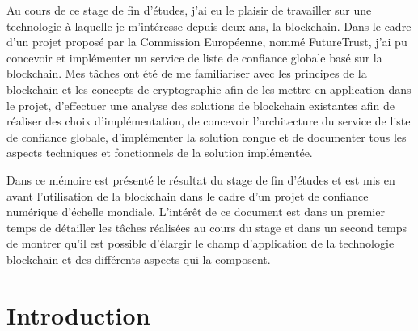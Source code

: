 \documentclass{tnreport}
\begin{document}
Au cours de ce stage de fin d'études, j'ai eu le plaisir de travailler sur une technologie à laquelle je m'intéresse depuis deux ans, la blockchain. Dans le cadre d'un projet proposé par la Commission Européenne, nommé FutureTrust, j'ai pu concevoir et implémenter un service de liste de confiance globale basé sur la blockchain. Mes tâches ont été de me familiariser avec les principes de la blockchain et les concepts de cryptographie afin de les mettre en application dans le projet, d'effectuer une analyse des solutions de blockchain existantes afin de réaliser des choix d'implémentation, de concevoir l'architecture du service de liste de confiance globale, d'implémenter la solution conçue et de documenter tous les aspects techniques et fonctionnels de la solution implémentée.

Dans ce mémoire est présenté le résultat du stage de fin d'études et est mis en avant l'utilisation de la blockchain dans le cadre d'un projet de confiance numérique d'échelle mondiale. L'intérêt de ce document est dans un premier temps de détailler les tâches réalisées au cours du stage et dans un second temps de montrer qu'il est possible d'élargir le champ d'application de la technologie blockchain et des différents aspects qui la composent.

\cleardoublepage

\renewcommand{\baselinestretch}{0.5}\normalsize
\tableofcontents
\renewcommand{\baselinestretch}{1.0}\normalsize
\cleardoublepage

\setcounter{page}{1}

\chapter{Introduction}
\end{document}
